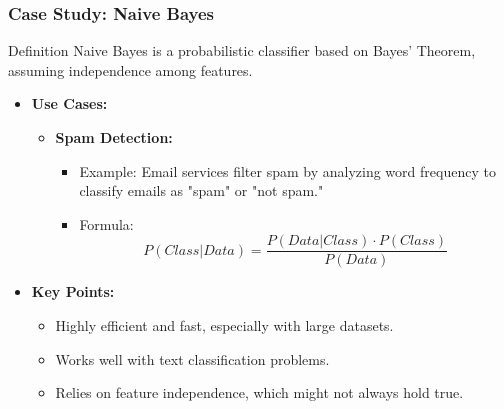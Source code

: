 \documentclass[aspectratio=169]{beamer}
\begin{document}
\begin{frame}[fragile]
    \frametitle{Case Study: Naive Bayes}
    \begin{block}{Definition}
        Naive Bayes is a probabilistic classifier based on Bayes' Theorem, assuming independence among features.
    \end{block}

    \begin{itemize}
        \item \textbf{Use Cases:}
        \begin{itemize}
            \item \textbf{Spam Detection:}
            \begin{itemize}
                \item Example: Email services filter spam by analyzing word frequency to classify emails as "spam" or "not spam."
                \item Formula: 
                \begin{equation}
                    P(Class|Data) = \frac{P(Data|Class) \cdot P(Class)}{P(Data)}
                \end{equation}
            \end{itemize}
        \end{itemize}
        
        \item \textbf{Key Points:}
        \begin{itemize}
            \item Highly efficient and fast, especially with large datasets.
            \item Works well with text classification problems.
            \item Relies on feature independence, which might not always hold true.
        \end{itemize}
    \end{itemize}
\end{frame}
\end{document}
